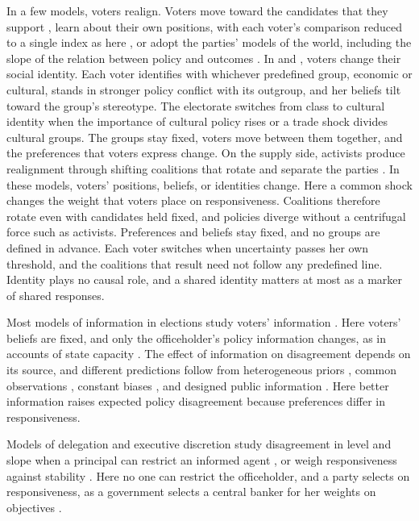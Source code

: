 \documentclass[12pt,letterpaper]{article}
\begin{document}
In a few models, voters realign. Voters move toward the candidates that they support \citep{CallanderCarbajal2022}, learn about their own positions, with each voter's comparison reduced to a single index as here \citep{Vaeth2024}, or adopt the parties' models of the world, including the slope of the relation between policy and outcomes \citep{IzzoMartinCallander2023}. In \citet{BonomiGennaioliTabellini2021} and \citet{GennaioliTabellini2025}, voters change their social identity. Each voter identifies with whichever predefined group, economic or cultural, stands in stronger policy conflict with its outgroup, and her beliefs tilt toward the group's stereotype. The electorate switches from class to cultural identity when the importance of cultural policy rises or a trade shock divides cultural groups. The groups stay fixed, voters move between them together, and the preferences that voters express change. On the supply side, activists produce realignment through shifting coalitions that rotate and separate the parties \citep{MillerSchofield2003}. In these models, voters' positions, beliefs, or identities change. Here a common shock changes the weight that voters place on responsiveness. Coalitions therefore rotate even with candidates held fixed, and policies diverge without a centrifugal force such as activists. Preferences and beliefs stay fixed, and no groups are defined in advance. Each voter switches when uncertainty passes her own threshold, and the coalitions that result need not follow any predefined line. Identity plays no causal role, and a shared identity matters at most as a marker of shared responses.

Most models of information in elections study voters' information \citep{Ashworth2012,BesleyBurgess2002,SnyderStromberg2010,Izzo2023,IzzoInvernizziCrosson2025}. Here voters' beliefs are fixed, and only the officeholder's policy information changes, as in accounts of state capacity \citep{Scott1998,Brambor2020}. The effect of information on disagreement depends on its source, and different predictions follow from heterogeneous priors \citep{KartikLeeSuen2021}, common observations \citep{DixitWeibull2007}, constant biases \citep{CrawfordSobel1982}, and designed public information \citep{AlonsoCamara2016}. Here better information raises expected policy disagreement because preferences differ in responsiveness.

Models of delegation and executive discretion study disagreement in level and slope when a principal can restrict an informed agent \citep{MelumadShibano1991,AlonsoMatouschek2008,AmadorBagwell2013}, or weigh responsiveness against stability \citep{HowellWolton2018,LoeperDziuda2024}. Here no one can restrict the officeholder, and a party selects on responsiveness, as a government selects a central banker for her weights on objectives \citep{Rogoff1985}.
\end{document}
